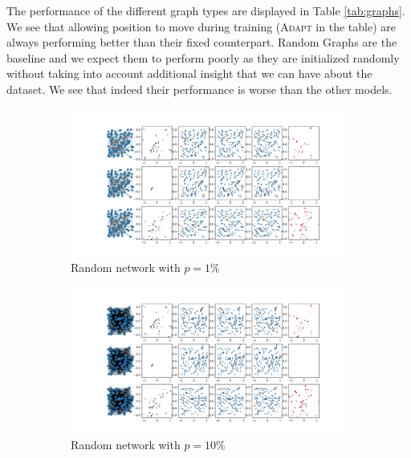 \documentclass[a4paper,10pt]{article}
\begin{document}
The performance of the different graph types are displayed in Table \ref{tab:graphs}.
We see that allowing position to move during training (\textsc{Adapt} in the table) are always performing better than their fixed counterpart. Random Graphs are the baseline and we expect them to perform poorly as they are initialized randomly without taking into account additional insight that we can have about the dataset. We see that indeed their performance is worse than the other models.

\begin{figure}[htbp]
  \begin{subfigure}{0.24\textwidth}
    \centering
    \includegraphics[trim={0 13.2cm 29.35cm 0},clip,width=\textwidth]{../results/rn1-100N-noemb-fixed}
    \caption{Random network with $p=1\%$}
  \end{subfigure}
  \begin{subfigure}{0.24\textwidth}
    \centering
    \includegraphics[trim={0 13.2cm 29.35cm 0},clip,width=\textwidth]{../results/rn10-100N-noemb-fixed}
    \caption{Random network with $p=10\%$}
  \end{subfigure}
  \begin{subfigure}{0.24\textwidth}

\end{subfigure}
\end{figure}
\end{document}
